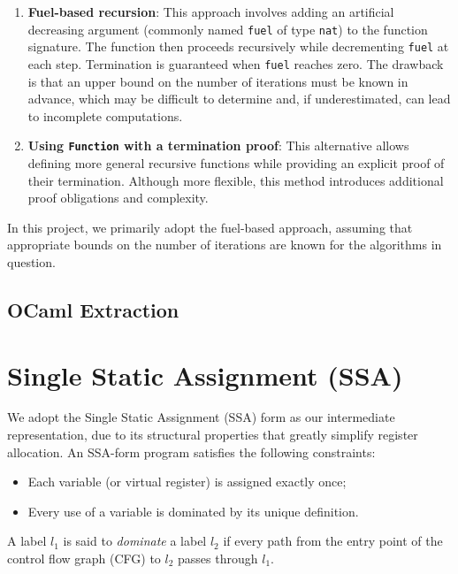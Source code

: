 \begin{enumerate}
    \item \textbf{Fuel-based recursion}: This approach involves adding an artificial decreasing argument (commonly named \texttt{fuel} of type \texttt{nat}) to the function signature. The function then proceeds recursively while decrementing \texttt{fuel} at each step. Termination is guaranteed when \texttt{fuel} reaches zero. The drawback is that an upper bound on the number of iterations must be known in advance, which may be difficult to determine and, if underestimated, can lead to incomplete computations.
    
    \item \textbf{Using \texttt{Function} with a termination proof}: This alternative allows defining more general recursive functions while providing an explicit proof of their termination. Although more flexible, this method introduces additional proof obligations and complexity.
\end{enumerate}

In this project, we primarily adopt the fuel-based approach, assuming that appropriate bounds on the number of iterations are known for the algorithms in question.

\subsection{OCaml Extraction}

\section{Single Static Assignment (SSA)}
\label{sec:ssa}

We adopt the Single Static Assignment (SSA) form as our intermediate representation, due to its structural properties that greatly simplify register allocation. An SSA-form program satisfies the following constraints:

\begin{itemize}
    \item Each variable (or virtual register) is assigned exactly once;
    \item Every use of a variable is dominated by its unique definition.
\end{itemize}

A label $l_1$ is said to \textit{dominate} a label $l_2$ if every path from the entry point of the control flow graph (CFG) to $l_2$ passes through $l_1$.


